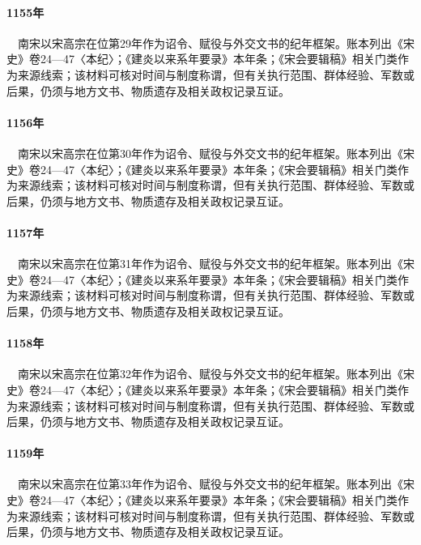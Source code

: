 \paragraph{1155年}　南宋以宋高宗在位第29年作为诏令、赋役与外交文书的纪年框架。账本列出《宋史》卷24—47〈本纪〉；《建炎以来系年要录》本年条；《宋会要辑稿》相关门类作为来源线索；该材料可核对时间与制度称谓，但有关执行范围、群体经验、军数或后果，仍须与地方文书、物质遗存及相关政权记录互证。

\paragraph{1156年}　南宋以宋高宗在位第30年作为诏令、赋役与外交文书的纪年框架。账本列出《宋史》卷24—47〈本纪〉；《建炎以来系年要录》本年条；《宋会要辑稿》相关门类作为来源线索；该材料可核对时间与制度称谓，但有关执行范围、群体经验、军数或后果，仍须与地方文书、物质遗存及相关政权记录互证。

\paragraph{1157年}　南宋以宋高宗在位第31年作为诏令、赋役与外交文书的纪年框架。账本列出《宋史》卷24—47〈本纪〉；《建炎以来系年要录》本年条；《宋会要辑稿》相关门类作为来源线索；该材料可核对时间与制度称谓，但有关执行范围、群体经验、军数或后果，仍须与地方文书、物质遗存及相关政权记录互证。

\paragraph{1158年}　南宋以宋高宗在位第32年作为诏令、赋役与外交文书的纪年框架。账本列出《宋史》卷24—47〈本纪〉；《建炎以来系年要录》本年条；《宋会要辑稿》相关门类作为来源线索；该材料可核对时间与制度称谓，但有关执行范围、群体经验、军数或后果，仍须与地方文书、物质遗存及相关政权记录互证。

\paragraph{1159年}　南宋以宋高宗在位第33年作为诏令、赋役与外交文书的纪年框架。账本列出《宋史》卷24—47〈本纪〉；《建炎以来系年要录》本年条；《宋会要辑稿》相关门类作为来源线索；该材料可核对时间与制度称谓，但有关执行范围、群体经验、军数或后果，仍须与地方文书、物质遗存及相关政权记录互证。

